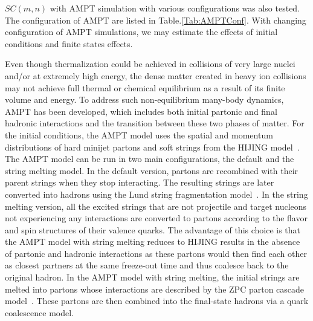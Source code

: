  $SC(m,n)$ with AMPT \cite{Zhang:1999bd,Lin:2000cx,Lin:2004en} simulation with various configurations was also tested. The configuration of AMPT are listed in Table.\ref{Tab:AMPTConf}. With changing configuration of AMPT simulations, we may estimate the effects of initial conditions and finite states effects. 

Even though thermalization could be achieved in collisions of very large nuclei and/or at extremely high energy, the dense matter created in heavy ion collisions may not achieve full thermal or chemical equilibrium as a result of its finite volume and energy. To address such non-equilibrium many-body dynamics, AMPT has been developed, which includes both initial partonic and final hadronic interactions and the transition between these two phases of matter.
For the initial conditions, the AMPT model uses the spatial and momentum distributions of hard minijet partons and soft strings from the HIJING model~\cite{Wang:1991hta,Gyulassy:1994ew}.
The AMPT model can be run in two main configurations, the default and the string melting model.
In the default version, partons are recombined with their parent strings when they stop interacting. The resulting strings are later converted into hadrons using the Lund string fragmentation model~\cite{Andersson:1986gw,NilssonAlmqvist:1986rx}. In the string melting version,  all the excited strings that are not projectile and target nucleons not experiencing any interactions are converted to partons according to the flavor and spin structures of their valence quarks. The advantage of this choice is that the AMPT model with string melting reduces to HIJING results in the absence of partonic and hadronic interactions as these partons would then find each other as closest partners at the same freeze-out time and thus coalesce back to the original hadron. In the AMPT model with string melting, the initial strings are melted into partons whose interactions are described by the ZPC parton cascade model~\cite{Zhang:1997ej}. These partons are then combined into the final-state hadrons via a quark coalescence model.  \cite{Lin:2005br}


